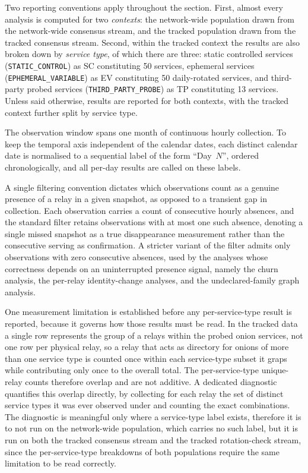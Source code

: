 \documentclass[conference]{IEEEtran}
\begin{document}
Two reporting conventions apply throughout the section. First, almost every analysis is computed for two \textit{contexts}: the network-wide population drawn from the network-wide consensus stream, and 
the tracked population drawn from the tracked consensus stream. Second, within the tracked context the results are also broken down by \textit{service type}, of which there are three: static controlled 
services (\texttt{STATIC\_CONTROL}) as SC constituting 50 services, ephemeral services (\texttt{EPHEMERAL\_VARIABLE}) as EV constituting 50 daily-rotated services, and third-party probed 
services (\texttt{THIRD\_PARTY\_PROBE}) as TP constituting 13 services. Unless said otherwise, results are reported for both contexts, with the tracked context further split by service type.
 
The observation window spans one month of continuous hourly collection. To keep the temporal axis independent of the calendar dates, each distinct calendar date is normalised to a 
sequential label of the form ``Day~$N$'', ordered chronologically, and all per-day results are called on these labels.
 
A single filtering convention dictates which observations count as a genuine presence of a relay in a given snapshot, as opposed to a transient gap in collection. Each observation carries a count 
of consecutive hourly absences, and the standard filter retains observations with at most one such absence, denoting a single missed snapshot as a true disappearance measurement rather than the 
consecutive serving as confirmation. A stricter variant of the filter admits only observations with zero consecutive absences, used by the analyses whose correctness depends on an uninterrupted presence signal, 
namely the churn analysis, the per-relay identity-change analyses, and the undeclared-family graph analysis.

One measurement limitation is established before any per-service-type result is reported, because it governs how those results must be read. In the tracked data a single row represents the group of a relays 
within the probed onion services, not one row per physical relay, so a relay that acts as directory for onions of more than one service type is counted once within each service-type subset it graps while 
contributing only once to the overall total. The per-service-type unique-relay counts therefore overlap and are not additive. A dedicated diagnostic quantifies this overlap directly, by collecting for 
each relay the set of distinct service types it was ever observed under and counting the exact combinations. The diagnostic is meaningful only where a service-type label exists, therefore it is to not run 
on the network-wide population, which carries no such label, but it is run on both the tracked consensus stream and the tracked rotation-check stream, since the per-service-type breakdowns of both 
populations require the same limitation to be read correctly.
 
\end{document}

